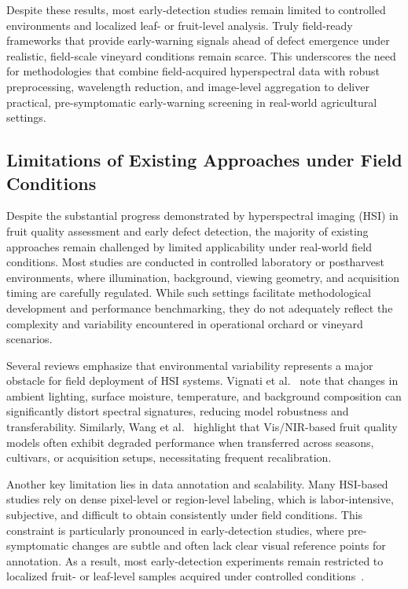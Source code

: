 \medskip
\noindent
Despite these results, most early-detection studies remain limited to controlled environments
and localized leaf- or fruit-level analysis. Truly field-ready frameworks that provide early-warning
signals ahead of defect emergence under realistic, field-scale vineyard conditions remain scarce. This
underscores the need for methodologies that combine field-acquired hyperspectral data with robust
preprocessing, wavelength reduction, and image-level aggregation to deliver practical, pre-symptomatic
early-warning screening in real-world agricultural settings.


\subsection{Limitations of Existing Approaches under Field Conditions}

\noindent
Despite the substantial progress demonstrated by hyperspectral imaging (HSI) in fruit
quality assessment and early defect detection, the majority of existing approaches remain
challenged by limited applicability under real-world field conditions. Most studies are
conducted in controlled laboratory or postharvest environments, where illumination,
background, viewing geometry, and acquisition timing are carefully regulated. While such
settings facilitate methodological development and performance benchmarking, they do
not adequately reflect the complexity and variability encountered in operational orchard
or vineyard scenarios.

\medskip
\noindent
Several reviews emphasize that environmental variability represents a major obstacle
for field deployment of HSI systems. Vignati et al.~\cite{app13179740} note that changes
in ambient lighting, surface moisture, temperature, and background composition can
significantly distort spectral signatures, reducing model robustness and transferability.
Similarly, Wang et al.~\cite{agriculture15202167} highlight that Vis/NIR-based fruit quality
models often exhibit degraded performance when transferred across seasons, cultivars,
or acquisition setups, necessitating frequent recalibration.

\medskip
\noindent
Another key limitation lies in data annotation and scalability. Many HSI-based studies
rely on dense pixel-level or region-level labeling, which is labor-intensive, subjective,
and difficult to obtain consistently under field conditions. This constraint is particularly
pronounced in early-detection studies, where pre-symptomatic changes are subtle and
often lack clear visual reference points for annotation. As a result, most early-detection
experiments remain restricted to localized fruit- or leaf-level samples acquired under
controlled conditions~\cite{haghbin2023non,zhang2024early}.


